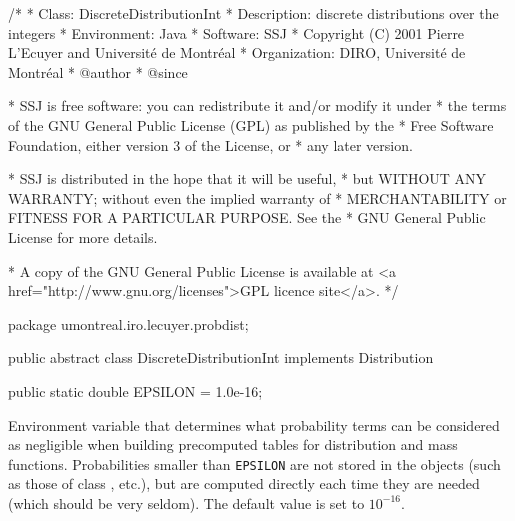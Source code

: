 \begin{code}
\begin{hide}
/*
 * Class:        DiscreteDistributionInt
 * Description:  discrete distributions over the integers
 * Environment:  Java
 * Software:     SSJ 
 * Copyright (C) 2001  Pierre L'Ecuyer and Université de Montréal
 * Organization: DIRO, Université de Montréal
 * @author       
 * @since

 * SSJ is free software: you can redistribute it and/or modify it under
 * the terms of the GNU General Public License (GPL) as published by the
 * Free Software Foundation, either version 3 of the License, or
 * any later version.

 * SSJ is distributed in the hope that it will be useful,
 * but WITHOUT ANY WARRANTY; without even the implied warranty of
 * MERCHANTABILITY or FITNESS FOR A PARTICULAR PURPOSE.  See the
 * GNU General Public License for more details.

 * A copy of the GNU General Public License is available at
   <a href="http://www.gnu.org/licenses">GPL licence site</a>.
 */
\end{hide}
package umontreal.iro.lecuyer.probdist;

public abstract class DiscreteDistributionInt implements Distribution\begin{hide} {\end{hide}

   public static double EPSILON = 1.0e-16;\end{code}
 \begin{tabb} Environment variable that determines what probability terms can
  be considered as negligible when building precomputed tables for
  distribution and mass functions.  Probabilities smaller than \texttt{EPSILON}
  are not stored in the
   objects
  (such as those of class , etc.), but are computed
  directly each time they are needed (which should be very seldom).
  The default value is set to $10^{-16}$.
 \end{tabb}
